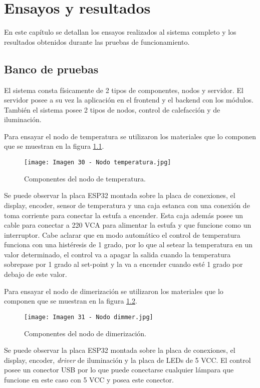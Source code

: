 \chapter{Ensayos y resultados}

\label{Chapter4}

En este capítulo se detallan los ensayos realizados al sistema completo y los resultados obtenidos durante las pruebas de funcionamiento.

\section{Banco de pruebas}

El sistema consta físicamente de 2 tipos de componentes, nodos y servidor. El servidor posee a su vez la aplicación en el frontend y el backend con los módulos. También el sistema posee 2 tipos de nodos, control de calefacción y de iluminación.

Para ensayar el nodo de temperatura se utilizaron los materiales que lo componen que se muestran en la figura \ref{fig:30}.

\begin{figure}[h]
\centering
\texttt{[image: Imagen 30 - Nodo temperatura.jpg]}
\caption[Nodo temperatura]{Componentes del nodo de temperatura.}
\label{fig:30}
\end{figure}

Se puede observar la placa ESP32 montada sobre la placa de conexiones, el display, encoder, sensor de temperatura y una caja estanca con una conexión de toma corriente para conectar la estufa a encender. Esta caja además posee un cable para conectar a 220 VCA para alimentar la estufa y que funcione como un interruptor. Cabe aclarar que en modo automático el control de temperatura funciona con una histéresis de 1 grado, por lo que al setear la temperatura en un valor determinado, el control va a apagar la salida cuando la temperatura sobrepase por 1 grado al set-point y la va a encender cuando esté 1 grado por debajo de este valor.

Para ensayar el nodo de dimerización se utilizaron los materiales que lo componen que se muestran en la figura \ref{fig:31}.

\begin{figure}[h]
\centering
\texttt{[image: Imagen 31 - Nodo dimmer.jpg]}
\caption[Nodo dimmer]{Componentes del nodo de dimerización.}
\label{fig:31}
\end{figure}

Se puede observar la placa ESP32 montada sobre la placa de conexiones, el display, encoder, \textit{driver} de iluminación y la placa de LEDs de 5 VCC. El control posee un conector USB por lo que puede conectarse cualquier lámpara que funcione en este caso con 5 VCC y posea este conector.

